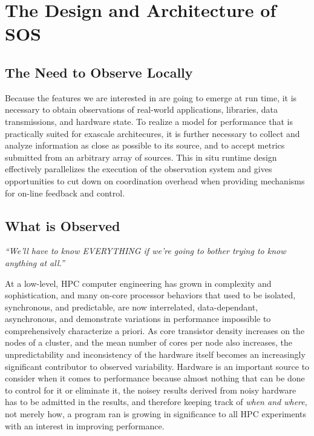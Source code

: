 
\section{The Design and Architecture of SOS}


\subsection{The Need to Observe Locally}

Because the features we are interested in are going to emerge at run
time, it is necessary to obtain observations of real-world
applications, libraries, data transmissions, and hardware state.
%
To realize a model for performance that is practically suited for
exascale architecures, it is further necessary to collect and analyze
information as close as possible to its source, and to accept metrics
submitted from an arbitrary array of sources.
%
This in situ runtime design effectively parallelizes the execution of
the observation system and gives opportunities to cut down on
coordination overhead when providing mechanisms for on-line feedback
and control.



\subsection{What is Observed}

\textit{``We'll have to know EVERYTHING if we're going to bother trying to
know anything at all.''}

At a low-level, HPC computer engineering has grown in complexity and
sophistication, and many on-core processor behaviors that used to be
isolated, synchronous, and predictable, are now interrelated,
data-dependant, asynchronous, and demonstrate variations in
performance impossible to comprehensively characterize a priori.
%
As core transistor density increases on the nodes of a cluster, and
the mean number of cores per node also increases, the unpredictability
and inconsistency of the hardware itself becomes an increasingly
significant contributor to observed variability.
%
Hardware is an important source to consider when it comes to
performance because almost nothing that can be done to control for it
or eliminate it, the noisey results derived from noisy hardware has to
be admitted in the results, and therefore keeping track of
\textit{when and where}, not merely how, a program ran is growing in
significance to all HPC experiments with an interest in improving
performance.

